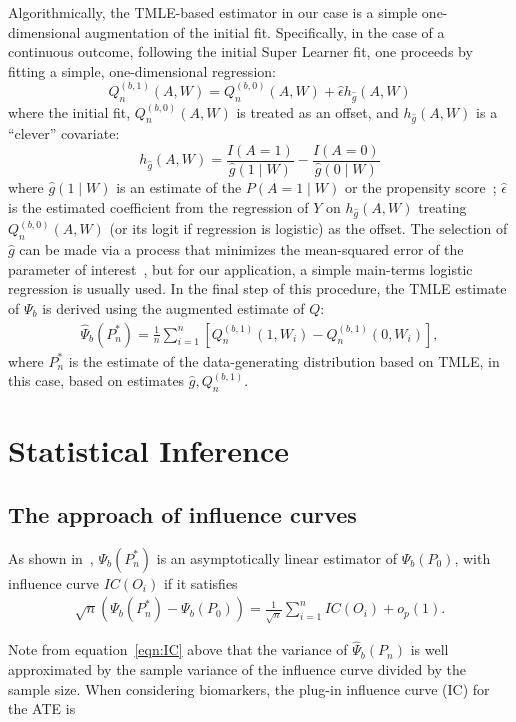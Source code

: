 Algorithmically, the TMLE-based estimator in our case is a simple
one-dimensional augmentation of the initial fit. Specifically, in the case of
a continuous outcome, following the initial Super Learner fit, one proceeds by
fitting a simple, one-dimensional regression:
$$
Q^{(b, 1)}_n(A, W) = Q^{(b, 0)}_n(A, W) + \hat{\epsilon} h_{\hat{g}}(A, W)
$$
where the initial fit, $Q^{(b, 0)}_n(A, W)$ is treated as an offset, and
$h_{\hat{g}}(A, W)$ is a ``clever'' covariate:
$$
h_{\hat{g}}(A, W) = \frac{I(A = 1)}{\hat{g}(1 \mid W)} - \frac{I(A = 0)}{\hat{g}(0 \mid W)}
$$
where $\hat{g}(1 \mid W)$ is an estimate of the $P(A = 1 \mid W)$ or the
propensity score~\cite{rosenbaum1983central}; $\hat{\epsilon}$ is the estimated
coefficient from the regression of $Y$ on $h_{\hat{g}}(A, W)$ treating
$Q^{(b, 0)}_n(A, W)$ (or its logit if regression is logistic) as the offset.
The selection of $\hat{g}$ can be made via a process that minimizes the
mean-squared error of the parameter of interest~\cite{gruber2010application},
but for our application, a simple main-terms logistic regression is usually
used. In the final step of this procedure, the TMLE estimate of $\Psi_b$ is
derived using the augmented estimate of $Q$:
\begin{eqnarray}
\hat{\Psi}_b(P^*_n) = \frac{1}{n}\sum^{n}_{i = 1}[Q^{(b, 1)}_n(1, W_i) - Q^{(b, 1)}_{n}(0, W_i)],
\end{eqnarray}
where $P^*_n$ is the estimate of the data-generating distribution based on TMLE,
in this case, based on estimates $\hat{g},Q^{(b,1)}_n$.

\section{Statistical Inference}\label{inference}

\subsection{The approach of influence curves}\label{ic}

As shown in~\cite{van2011targeted}, $\Psi_b(P^*_n)$ is an asymptotically
linear estimator of $\Psi_b(P_0)$, with influence curve $IC(O_i)$ if it
satisfies
\begin{eqnarray}
\sqrt{n}(\Psi_b(P^*_n) - \Psi_b(P_0)) = \frac{1}{\sqrt{n}}\sum^{n}_{i = 1}IC(O_i) + o_p(1).
\label{eqn:IC}
\end{eqnarray}

Note from equation~\ref{eqn:IC} above that the variance of $\hat{\Psi}_b(P_n)$
is well approximated by the sample variance of the influence curve divided by
the sample size. When considering biomarkers, the plug-in influence curve (IC)
for the ATE is

